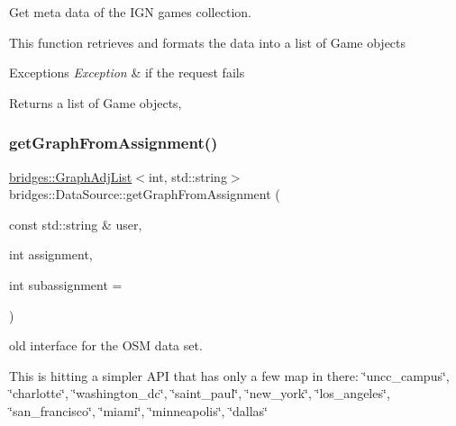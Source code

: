 Get meta data of the I\+GN games collection. 

This function retrieves and formats the data into a list of Game objects


\begin{DoxyExceptions}{Exceptions}
{\em Exception} & if the request fails\\
\hline
\end{DoxyExceptions}
\begin{DoxyReturn}{Returns}
a list of Game objects, 
\end{DoxyReturn}
\mbox{\label{classbridges_1_1_data_source_ac4edf55c163c60f17b13f5499e5d2e65}} 
\subsubsection{\texorpdfstring{get\+Graph\+From\+Assignment()}{getGraphFromAssignment()}}
{\footnotesize\ttfamily \hyperlink{classbridges_1_1datastructure_1_1_graph_adj_list}{bridges\+::\+Graph\+Adj\+List}$<$int, std\+::string$>$ bridges\+::\+Data\+Source\+::get\+Graph\+From\+Assignment (\begin{DoxyParamCaption}\item[{const std\+::string \&}]{user,  }\item[{int}]{assignment,  }\item[{int}]{subassignment = {} }\end{DoxyParamCaption})\hspace{0.3cm}{\ttfamily [inline]}}



old interface for the O\+SM data set. 

This is hitting a simpler A\+PI that has only a few map in there\+: \char`\"{}uncc\+\_\+campus\char`\"{}, \char`\"{}charlotte\char`\"{}, \char`\"{}washington\+\_\+dc\char`\"{}, \char`\"{}saint\+\_\+paul\char`\"{}, \char`\"{}new\+\_\+york\char`\"{}, \char`\"{}los\+\_\+angeles\char`\"{}, \char`\"{}san\+\_\+francisco\char`\"{}, \char`\"{}miami\char`\"{}, \char`\"{}minneapolis\char`\"{}, \char`\"{}dallas\char`\"{}


